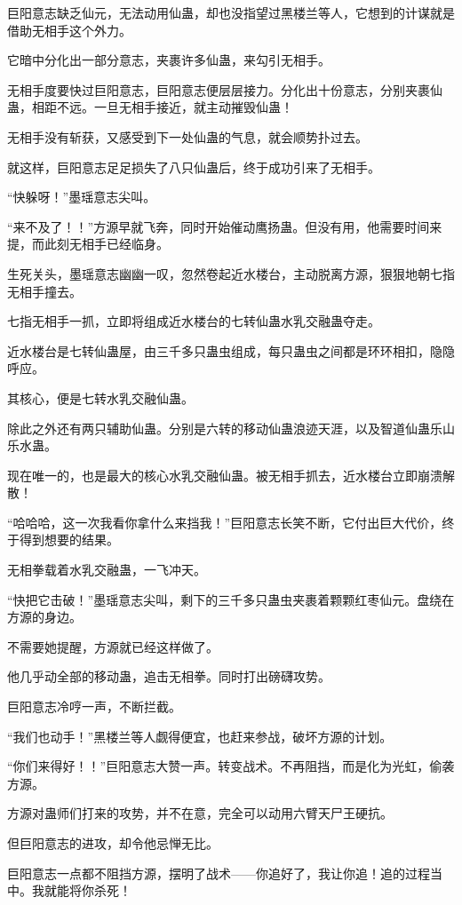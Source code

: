 \begin{this_body}
巨阳意志缺乏仙元，无法动用仙蛊，却也没指望过黑楼兰等人，它想到的计谋就是借助无相手这个外力。

它暗中分化出一部分意志，夹裹许多仙蛊，来勾引无相手。

无相手度要快过巨阳意志，巨阳意志便层层接力。分化出十份意志，分别夹裹仙蛊，相距不远。一旦无相手接近，就主动摧毁仙蛊！

无相手没有斩获，又感受到下一处仙蛊的气息，就会顺势扑过去。

就这样，巨阳意志足足损失了八只仙蛊后，终于成功引来了无相手。

“快躲呀！”墨瑶意志尖叫。

“来不及了！！”方源早就飞奔，同时开始催动鹰扬蛊。但没有用，他需要时间来提，而此刻无相手已经临身。

生死关头，墨瑶意志幽幽一叹，忽然卷起近水楼台，主动脱离方源，狠狠地朝七指无相手撞去。

七指无相手一抓，立即将组成近水楼台的七转仙蛊水乳交融蛊夺走。

近水楼台是七转仙蛊屋，由三千多只蛊虫组成，每只蛊虫之间都是环环相扣，隐隐呼应。

其核心，便是七转水乳交融仙蛊。

除此之外还有两只辅助仙蛊。分别是六转的移动仙蛊浪迹天涯，以及智道仙蛊乐山乐水蛊。

现在唯一的，也是最大的核心水乳交融仙蛊。被无相手抓去，近水楼台立即崩溃解散！

“哈哈哈，这一次我看你拿什么来挡我！”巨阳意志长笑不断，它付出巨大代价，终于得到想要的结果。

无相拳载着水乳交融蛊，一飞冲天。

“快把它击破！”墨瑶意志尖叫，剩下的三千多只蛊虫夹裹着颗颗红枣仙元。盘绕在方源的身边。

不需要她提醒，方源就已经这样做了。

他几乎动全部的移动蛊，追击无相拳。同时打出磅礴攻势。

巨阳意志冷哼一声，不断拦截。

“我们也动手！”黑楼兰等人觑得便宜，也赶来参战，破坏方源的计划。

“你们来得好！！”巨阳意志大赞一声。转变战术。不再阻挡，而是化为光虹，偷袭方源。

方源对蛊师们打来的攻势，并不在意，完全可以动用六臂天尸王硬抗。

但巨阳意志的进攻，却令他忌惮无比。

巨阳意志一点都不阻挡方源，摆明了战术——你追好了，我让你追！追的过程当中。我就能将你杀死！


\end{this_body}
